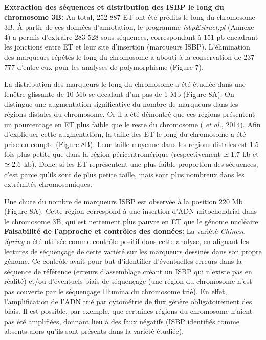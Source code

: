 \documentclass[a4paper, 12pt]{article}
\begin{document}
\begin{onehalfspace}
\textbf{Extraction des séquences et distribution des ISBP le long du chromosome 3B:} Au total, 252 887 ET ont été prédits le long du chromosome 3B. À partir de ces données d'annotation, le programme \textit{isbpExtract.pl} (Annexe 4) a permis d'extraire 283 528 sous-séquences, correspondant à 151 pb encadrant les jonctions entre ET et leur site d'insertion (marqueurs ISBP). L'élimination des marqueurs répétés le long du chromosome a abouti à la conservation de 237 777 d'entre eux pour les analyses de polymorphisme (Figure 7).

La distribution des marqueurs le long du chromosome a été étudiée dans une fenêtre glissante de 10 Mb se décalant d'un pas de 1 Mb (Figure 8A). On distingue une augmentation significative du nombre de marqueurs dans les régions distales du chromosome. Or il a été démontré que ces régions présentent un pourcentage en ET plus faible que le reste du chromosome ( \textit{et al.}, 2014). Afin d'expliquer cette augmentation, la taille des ET le long du chromosome a été prise en compte (Figure 8B). Leur taille moyenne dans les régions distales est 1.5 fois plus petite que dans la région péricentromérique (respectivement $\begin{simeq}1.7\end{simeq}$ kb et $\begin{simeq}2.5\end{simeq}$ kb). Donc, si les ET représentent une plus faible proportion des séquences, c'est parce qu'ils sont de plus petite taille, mais sont plus nombreux dans les extrémités chromosomiques.

Une chute du nombre de marqueurs ISBP est observée à la position 220 Mb (Figure 8A). Cette région correspond à une insertion d'ADN mitochondrial dans le chromosome 3B, qui est nettement plus pauvre en ET que le génome nucléaire.\\

\textbf{Faisabilité de l'approche et contrôles des données:} La variété \textit{Chinese Spring} a été utilisée comme contrôle positif dans cette analyse, en alignant les lectures de séquençage de cette variété sur les marqueurs dessinés dans son propre génome. Ce contrôle avait pour but d'identifier d'éventuelles erreurs dans la séquence de référence (erreurs d'assemblage créant un ISBP qui n'existe pas en réalité) et/ou d'éventuels biais de séquençage (une région du chromosome n'est pas couverte par le séquençage Illumina du chromosome trié). En effet, l'amplification de l'ADN trié par cytométrie de flux génère obligatoirement des biais. Il est possible, par exemple, que certaines régions du chromosome n'aient pas été amplifiées, donnant lieu à des faux négatifs (ISBP identifiés comme absents alors qu'ils sont présents dans la variété étudiée).


\end{onehalfspace}
\end{document}
